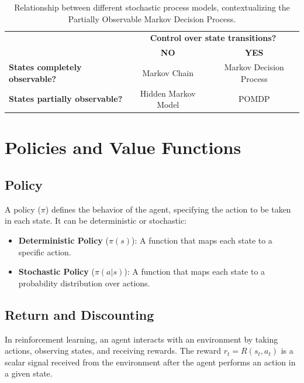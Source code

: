 \documentclass[../Main.tex]{subfiles}
\begin{document}
\begin{table}[H]
    \centering
    \begin{tabular}{|l|c|c|}
    \multicolumn{1}{c}{} & \multicolumn{2}{c}{\textbf{Control over state transitions?}} \\ \cline{2-3}
    \multicolumn{1}{c|}{} & \textbf{NO} & \textbf{YES} \\
    \hline
    \textbf{States completely observable?} & Markov Chain & Markov Decision Process \\
    \hline
    \textbf{States partially observable?} & Hidden Markov Model & POMDP \\
    \hline
    \end{tabular}
    \caption{Relationship between different stochastic process models, contextualizing the Partially Observable Markov Decision Process.}
    \label{tab:pomdp_context}
\end{table}
% 

\section{Policies and Value Functions}

\subsection{Policy}

A policy ($\pi$) defines the behavior of the agent, specifying the action to be taken in each state. It can be deterministic or stochastic:

\begin{itemize}
    \item \textbf{Deterministic Policy} ($\pi(s)$): A function that maps each state to a specific action.
    \item \textbf{Stochastic Policy} ($\pi(a|s)$): A function that maps each state to a probability distribution over actions.
\end{itemize}

\subsection{Return and Discounting}

In reinforcement learning, an agent interacts with an environment by taking actions, observing states, and receiving rewards. The reward $r_t = R(s_t, a_t)$ is a scalar signal received from the environment after the agent performs an action in a given state.
\end{document}
